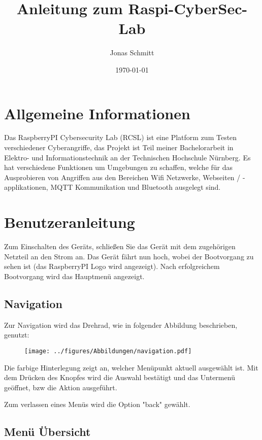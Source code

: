 \documentclass[a4paper,12pt]{article}
\title{\textbf{Anleitung zum Raspi-CyberSec-Lab}}
\author{Jonas Schmitt}
\date{\today}
\begin{document}
\maketitle
\vspace{7cm}

\section{Allgemeine Informationen}
Das RaspberryPI Cybersecurity Lab (RCSL) ist eine Platform zum Testen verschiedener Cyberangriffe, das Projekt ist Teil meiner Bachelorarbeit in Elektro- und Informationstechnik an der Technischen Hochschule Nürnberg.
Es hat verschiedene Funktionen um Umgebungen zu schaffen, welche für das Ausprobieren von Angriffen aus den Bereichen Wifi Netzwerke, Webseiten / -applikationen, MQTT Kommunikation und Bluetooth ausgelegt sind.


\section{Benutzeranleitung}

Zum Einschalten des Geräts, schließen Sie das Gerät mit dem zugehörigen Netzteil an den Strom an.
Das Gerät fährt nun hoch, wobei der Bootvorgang zu sehen ist (das RaspberryPI Logo wird angezeigt).
Nach erfolgreichem Bootvorgang wird das Hauptmenü angezeigt.

\newpage

\subsection{Navigation}
Zur Navigation wird das Drehrad, wie in folgender Abbildung beschrieben, genutzt:

\begin{figure}[h]
    \centering 
    \texttt{[image: ../figures/Abbildungen/navigation.pdf]}
    \label{fig:navigation}
\end{figure}


Die farbige Hinterlegung zeigt an, welcher Menüpunkt aktuell ausgewählt ist. 
Mit dem Drücken des Knopfes wird die Auswahl bestätigt und das Untermenü geöffnet, bzw die Aktion ausgeführt.

Zum verlassen eines Menüs wird die Option "back" gewählt.


\subsection{Menü Übersicht}
\end{document}
